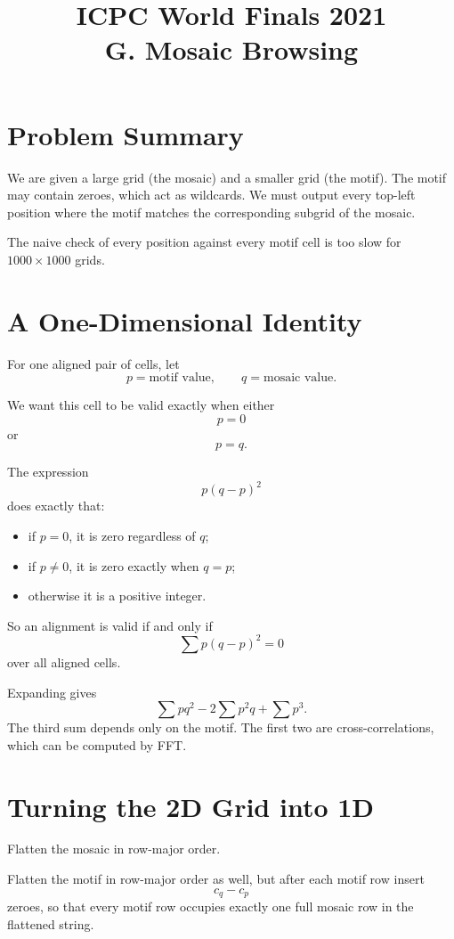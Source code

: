 \documentclass[11pt]{article}
\title{ICPC World Finals 2021\\G. Mosaic Browsing}
\author{}
\date{}
\begin{document}
\maketitle

\section*{Problem Summary}

We are given a large grid (the mosaic) and a smaller grid (the motif). The motif may contain zeroes,
which act as wildcards. We must output every top-left position where the motif matches the corresponding
subgrid of the mosaic.

The naive check of every position against every motif cell is too slow for $1000 \times 1000$ grids.

\section*{A One-Dimensional Identity}

For one aligned pair of cells, let
\[
    p = \text{motif value}, \qquad q = \text{mosaic value}.
\]

We want this cell to be valid exactly when either
\[
    p = 0
\]
or
\[
    p = q.
\]

The expression
\[
    p(q-p)^2
\]
does exactly that:
\begin{itemize}[leftmargin=*]
    \item if $p=0$, it is zero regardless of $q$;
    \item if $p \ne 0$, it is zero exactly when $q=p$;
    \item otherwise it is a positive integer.
\end{itemize}

So an alignment is valid if and only if
\[
    \sum p(q-p)^2 = 0
\]
over all aligned cells.

Expanding gives
\[
    \sum p q^2 - 2 \sum p^2 q + \sum p^3.
\]
The third sum depends only on the motif. The first two are cross-correlations, which can be computed by
FFT.

\section*{Turning the 2D Grid into 1D}

Flatten the mosaic in row-major order.

Flatten the motif in row-major order as well, but after each motif row insert
\[
    c_q - c_p
\]
zeroes, so that every motif row occupies exactly one full mosaic row in the flattened string.
\end{document}

